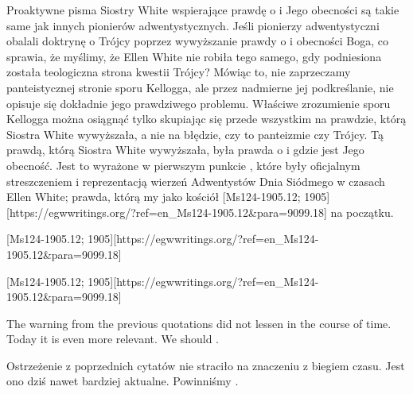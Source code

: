 Proaktywne pisma Siostry White wspierające prawdę o  i Jego obecności są takie same jak innych pionierów adwentystycznych. Jeśli pionierzy adwentystyczni obalali doktrynę o Trójcy poprzez wywyższanie prawdy o  i obecności Boga, co sprawia, że myślimy, że Ellen White nie robiła tego samego, gdy podniesiona została teologiczna strona kwestii Trójcy? Mówiąc to, nie zaprzeczamy panteistycznej stronie sporu Kellogga, ale przez nadmierne jej podkreślanie, nie opisuje się dokładnie jego prawdziwego problemu. Właściwe zrozumienie sporu Kellogga można osiągnąć tylko skupiając się przede wszystkim na prawdzie, którą Siostra White wywyższała, a nie na błędzie, czy to panteizmie czy Trójcy. Tą prawdą, którą Siostra White wywyższała, była prawda o  i gdzie jest Jego obecność. Jest to wyrażone w pierwszym punkcie , które były oficjalnym streszczeniem i reprezentacją wierzeń Adwentystów Dnia Siódmego w czasach Ellen White; prawda, którą my jako kościół [Ms124-1905.12; 1905][https://egwwritings.org/?ref=en\_Ms124-1905.12&para=9099.18] na początku.


[Ms124-1905.12; 1905][https://egwwritings.org/?ref=en\_Ms124-1905.12&para=9099.18]


[Ms124-1905.12; 1905][https://egwwritings.org/?ref=en\_Ms124-1905.12&para=9099.18]


The warning from the previous quotations did not lessen in the course of time. Today it is even more relevant. We should .


Ostrzeżenie z poprzednich cytatów nie straciło na znaczeniu z biegiem czasu. Jest ono dziś nawet bardziej aktualne. Powinniśmy .
